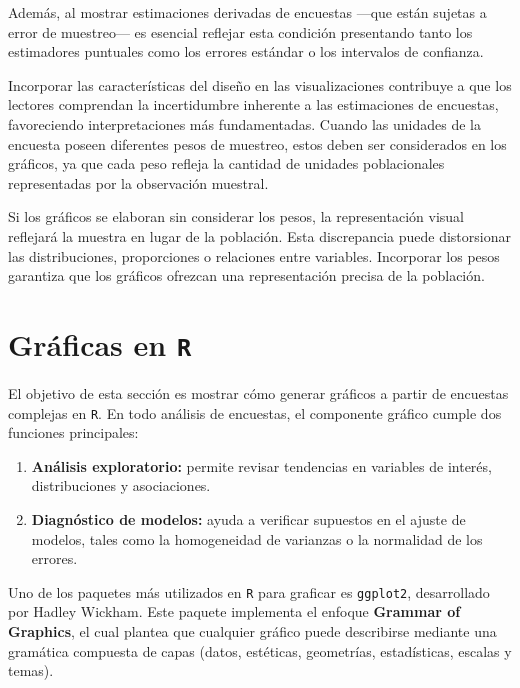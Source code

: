 \documentclass[
  spanish,
  12pt,
]{book}
\providecommand{\tightlist}{%
  \setlength{\itemsep}{0pt}\setlength{\parskip}{0pt}}
\begin{document}
Además, al mostrar estimaciones derivadas de encuestas ---que están sujetas a error de muestreo--- es esencial reflejar esta condición presentando tanto los estimadores puntuales como los errores estándar o los intervalos de confianza.

Incorporar las características del diseño en las visualizaciones contribuye a que los lectores comprendan la incertidumbre inherente a las estimaciones de encuestas, favoreciendo interpretaciones más fundamentadas. Cuando las unidades de la encuesta poseen diferentes pesos de muestreo, estos deben ser considerados en los gráficos, ya que cada peso refleja la cantidad de unidades poblacionales representadas por la observación muestral.

Si los gráficos se elaboran sin considerar los pesos, la representación visual reflejará la muestra en lugar de la población. Esta discrepancia puede distorsionar las distribuciones, proporciones o relaciones entre variables. Incorporar los pesos garantiza que los gráficos ofrezcan una representación precisa de la población.

\section{\texorpdfstring{Gráficas en \texttt{R}}{Gráficas en R}}\label{gruxe1ficas-en-r}

El objetivo de esta sección es mostrar cómo generar gráficos a partir de encuestas complejas en \texttt{R}. En todo análisis de encuestas, el componente gráfico cumple dos funciones principales:

\begin{enumerate}
\def\labelenumi{\arabic{enumi}.}
\tightlist
\item
  \textbf{Análisis exploratorio:} permite revisar tendencias en variables de interés, distribuciones y asociaciones.
\item
  \textbf{Diagnóstico de modelos:} ayuda a verificar supuestos en el ajuste de modelos, tales como la homogeneidad de varianzas o la normalidad de los errores.
\end{enumerate}

Uno de los paquetes más utilizados en \texttt{R} para graficar es \texttt{ggplot2}, desarrollado por Hadley Wickham. Este paquete implementa el enfoque \textbf{Grammar of Graphics}, el cual plantea que cualquier gráfico puede describirse mediante una gramática compuesta de capas (datos, estéticas, geometrías, estadísticas, escalas y temas).
\end{document}
